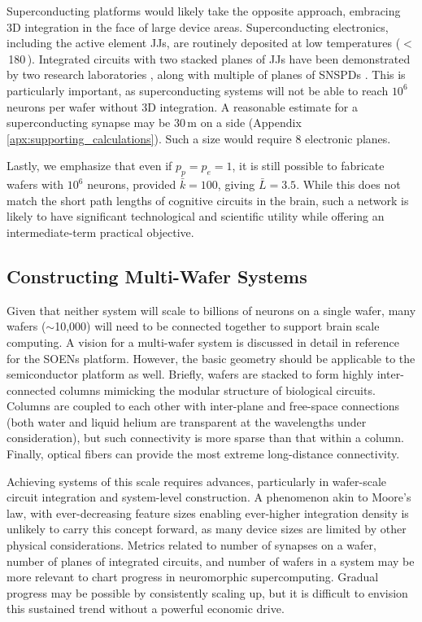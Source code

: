 \documentclass[twocolumn]{article}
\begin{document}
Superconducting platforms would likely take the opposite approach, embracing 3D integration in the face of large device areas. Superconducting electronics, including the active element JJs, are routinely deposited at low temperatures ($<$\,180\,\textcelsius). Integrated circuits with two stacked planes of JJs have been demonstrated by two research laboratories \cite{tobo2019,anna2017}, along with multiple of planes of SNSPDs \cite{vema2012}. This is particularly important, as superconducting systems will not be able to reach $10^6$ neurons per wafer without 3D integration. A reasonable estimate for a superconducting synapse may be 30\,\textmu m on a side (Appendix \ref{apx:supporting_calculations}). Such a size would require 8 electronic planes. 

Lastly, we emphasize that even if $p_p = p_e = 1$, it is still possible to fabricate wafers with $10^6$ neurons, provided $\bar{k} = 100$, giving $\bar{L} = 3.5$. While this does not match the short path lengths of cognitive circuits in the brain, such a network is likely to have significant technological and scientific utility while offering an intermediate-term practical objective.

\subsection{Constructing Multi-Wafer Systems}
Given that neither system will scale to billions of neurons on a single wafer, many wafers ($\sim$10,000) will need to be connected together to support brain scale computing. A vision for a multi-wafer system is discussed in detail in reference \cite{shainline2020optoelectronic} for the SOENs platform. However, the basic geometry should be applicable to the semiconductor platform as well. Briefly, wafers are stacked to form highly inter-connected columns mimicking the modular structure of biological circuits. Columns are coupled to each other with inter-plane and free-space connections (both water and liquid helium are transparent at the wavelengths under consideration), but such connectivity is more sparse than that within a column. Finally, optical fibers can provide the most extreme long-distance connectivity. 

Achieving systems of this scale requires advances, particularly in wafer-scale circuit integration and system-level construction. A phenomenon akin to Moore's law, with ever-decreasing feature sizes enabling ever-higher integration density is unlikely to carry this concept forward, as many device sizes are limited by other physical considerations. Metrics related to number of synapses on a wafer, number of planes of integrated circuits, and number of wafers in a system may be more relevant to chart progress in neuromorphic supercomputing. Gradual progress may be possible by consistently scaling up, but it is difficult to envision this sustained trend without a powerful economic drive.  
\end{document}
